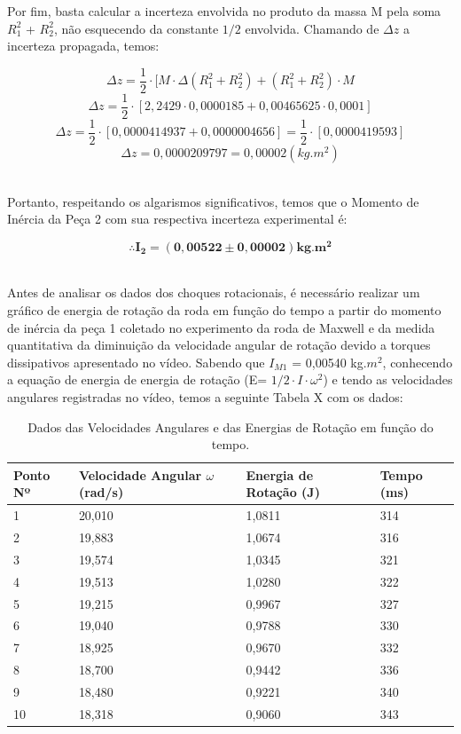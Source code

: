 Por fim, basta calcular a incerteza envolvida no produto da massa M pela soma $R_1^2$ + $R_2^2$, não esquecendo da constante $1/2$ envolvida. Chamando de $\Delta z$ a incerteza propagada, temos:

\[\Delta z = \frac {1}{2}\cdot[M\cdot \Delta(R_1^2 + R_2^2) + (R_1^2 + R_2^2)\cdot M\]
\[\Delta z = \frac {1}{2}\cdot[2,2429\cdot 0,0000185 + 0,00465625\cdot 0,0001]\]
\[\Delta z = \frac {1}{2}\cdot[0,0000414937 + 0,0000004656] =\frac {1}{2}\cdot[0,0000419593] \]
\[\Delta z = 0,0000209797 = 0,00002 (kg.m^2)\]\

Portanto, respeitando os algarismos significativos, temos que o Momento de Inércia da Peça 2 com sua respectiva incerteza experimental é:

\[\therefore \mathbf{I_2 = (0,00522 \pm 0,00002) kg.m^2}\]\

Antes de analisar os dados dos choques rotacionais, é necessário realizar um gráfico de energia de rotação da roda em função do tempo a partir do momento de inércia da peça 1 coletado no experimento da roda de Maxwell e da medida quantitativa da diminuição da velocidade angular de rotação devido a torques dissipativos apresentado no vídeo. Sabendo que $I_{M1}$ = 0,00540 kg.$m^2$, conhecendo a equação de energia de energia de rotação (E= $1/2\cdot I\cdot \omega^2$) e tendo as velocidades angulares registradas no vídeo, temos a seguinte Tabela X com os dados:\\

\begin{table}[H]
    \centering
    \begin{tabular}{ |M{2cm}||M{2cm}||M{2,5cm}||M{2cm}|}
        \hline
        \textbf{Ponto Nº} & \textbf{Velocidade Angular $\omega$ (rad/s)} & \textbf{Energia de Rotação (J)} & \textbf{Tempo (ms)}\\
           & 20,010    & 1,0811  & 314\\
        2   & 19,883    & 1,0674  & 316\\
        3   & 19,574    & 1,0345  & 321\\
        4   & 19,513    & 1,0280  & 322\\
        5   & 19,215    & 0,9967  & 327\\
        6   & 19,040    & 0,9788  & 330\\
        7   & 18,925    & 0,9670  & 332\\
        8   & 18,700    & 0,9442  & 336\\
        9   & 18,480    & 0,9221  & 340\\
        10  & 18,318    & 0,9060  & 343\\
        \hline
    \end{tabular}
    \caption{Dados das Velocidades Angulares e das Energias de Rotação em função do tempo.}
\end{table}


